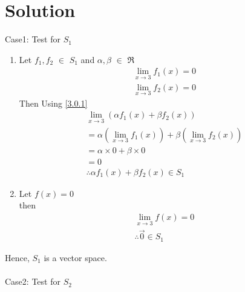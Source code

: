 \documentclass[journal,12pt,twocolumn]{IEEEtran}
\begin{document}
\section{Solution}
Case1: Test for $S_1$
\begin{enumerate}
\item Let $f_1,f_2$ $\in$ $S_1$ and $\alpha,\beta$ $\in$ $\Re$
\begin{equation}\label{3.0.1}
\begin{split}
\lim_{x\to3} f_1(x) = 0\\
\lim_{x\to3} f_2(x) = 0
\end{split}
\end{equation}
Then Using \eqref{3.0.1}
\begin{equation*}
\begin{split}
\lim_{x\to3} (\alpha f_1(x) + \beta f_2(x))\\
= \alpha \left(\lim_{x\to3} f_1(x)\right) + \beta \left(\lim_{x\to3} f_2(x)\right)\\
= \alpha \times 0 + \beta \times 0\\
= 0\\
 \therefore \alpha f_1(x) + \beta f_2(x) \in S_1
\end{split}
\end{equation*}
\item Let $f(x) = 0$\\
then 
\begin{equation*}
\begin{split}
\lim_{x\to3} f(x) = 0\\
\therefore \vec{0} \in S_1
\end{split}
\end{equation*}
\end{enumerate}
Hence, $S_1$ is a vector space.\\
\\
Case2: Test for $S_2$
\end{document}
